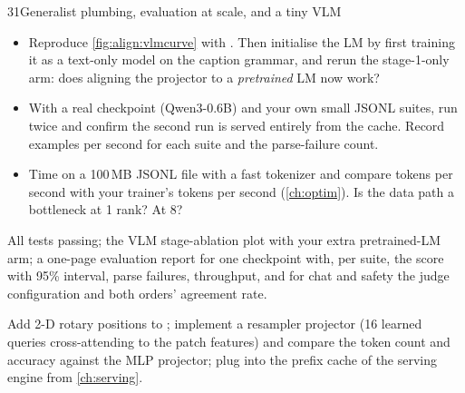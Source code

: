 \begin{labbox}{31}{Generalist plumbing, evaluation at scale, and a tiny VLM}
\begin{itemize}
  \item Reproduce \cref{fig:align:vlmcurve} with . Then initialise the LM by first
        training it as a text-only model on the caption grammar, and rerun the stage-1-only arm: does
        aligning the projector to a \emph{pretrained} LM now work?
  \item With a real checkpoint (Qwen3-0.6B) and your own small JSONL suites, run
         twice and confirm the second run is served entirely from the cache. Record
        examples per second for each suite and the parse-failure count.
  \item Time  on a 100\,MB JSONL file with a fast tokenizer and compare tokens per second
        with your trainer's tokens per second (\cref{ch:optim}). Is the data path a bottleneck at 1 rank? At 8?
\end{itemize}

All tests passing; the VLM stage-ablation plot with your extra pretrained-LM arm; a one-page evaluation
report for one checkpoint with, per suite, the score with 95\% interval, parse failures, throughput, and
for chat and safety the judge configuration and both orders' agreement rate.

Add 2-D rotary positions to ; implement a resampler projector (16 learned queries
cross-attending to the patch features) and compare the token count and accuracy against the MLP projector;
plug  into the prefix cache of the serving engine from \cref{ch:serving}.
\end{labbox}
